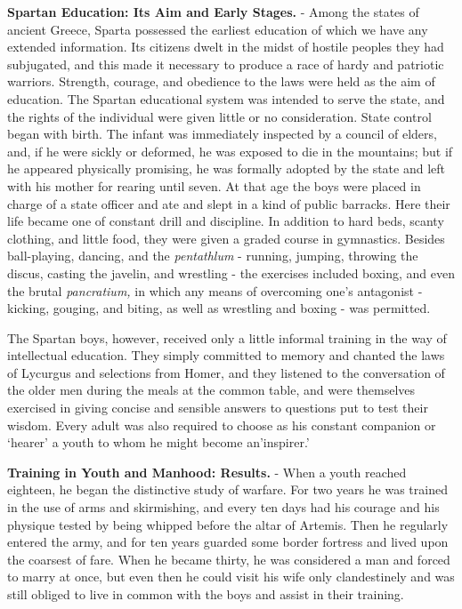 \documentclass[
]{book}
\begin{document}
\textbf{Spartan Education: Its Aim and Early Stages.} - Among the states of ancient Greece, Sparta possessed the earliest education of which we have any extended information. Its citizens dwelt in the midst of hostile peoples they had subjugated, and this made it necessary to produce a race of hardy and patriotic warriors. Strength, courage, and obedience to the laws were held as the aim of education. The Spartan educational system was intended to serve the state, and the rights of the individual were given little or no consideration. State control began with birth. The infant was immediately inspected by a council of elders, and, if he were sickly or deformed, he was exposed to die in the mountains; but if he appeared physically promising, he was formally adopted by the state and left with his mother for rearing until seven. At that age the boys were placed in charge of a state officer and ate and slept in a kind of public barracks. Here their life became one of constant drill and discipline. In addition to hard beds, scanty clothing, and little food, they were given a graded course in gymnastics. Besides ball-playing, dancing, and the \emph{pentathlum} - running, jumping, throwing the discus, casting the javelin, and wrestling - the exercises included boxing, and even the brutal \emph{pancratium,} in which any means of overcoming one's antagonist - kicking, gouging, and biting, as well as wrestling and boxing - was permitted.

The Spartan boys, however, received only a little informal training in the way of intellectual education. They simply committed to memory and chanted the laws of Lycurgus and selections from Homer, and they listened to the conversation of the older men during the meals at the common table, and were themselves exercised in giving concise and sensible answers to questions put to test their wisdom. Every adult was also required to choose as his constant companion or `hearer' a youth to whom he might become an'inspirer.'

\textbf{Training in Youth and Manhood: Results.} - When a youth reached eighteen, he began the distinctive study of warfare. For two years he was trained in the use of arms and skirmishing, and every ten days had his courage and his physique tested by being whipped before the altar of Artemis. Then he regularly entered the army, and for ten years guarded some border fortress and lived upon the coarsest of fare. When he became thirty, he was considered a man and forced to marry at once, but even then he could visit his wife only clandestinely and was still obliged to live in common with the boys and assist in their training.
\end{document}
